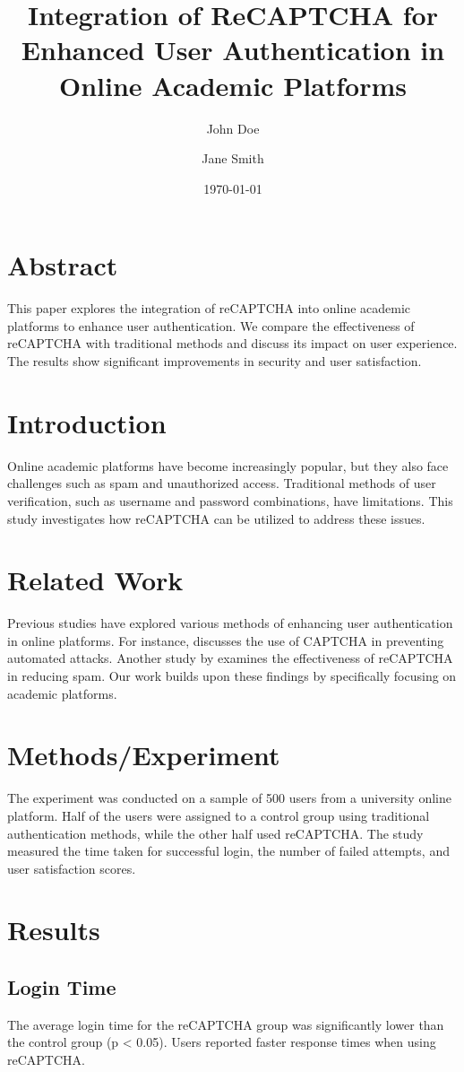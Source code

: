 \documentclass{article}
\title{Integration of ReCAPTCHA for Enhanced User Authentication in Online Academic Platforms}
\author{John Doe \and Jane Smith}
\date{\today}
\begin{document}
\maketitle

\section{Abstract}
This paper explores the integration of reCAPTCHA into online academic platforms to enhance user authentication. We compare the effectiveness of reCAPTCHA with traditional methods and discuss its impact on user experience. The results show significant improvements in security and user satisfaction.

\section{Introduction}
Online academic platforms have become increasingly popular, but they also face challenges such as spam and unauthorized access. Traditional methods of user verification, such as username and password combinations, have limitations. This study investigates how reCAPTCHA can be utilized to address these issues.

\section{Related Work}
Previous studies have explored various methods of enhancing user authentication in online platforms. For instance, \cite{ref1} discusses the use of CAPTCHA in preventing automated attacks. Another study by \cite{ref2} examines the effectiveness of reCAPTCHA in reducing spam. Our work builds upon these findings by specifically focusing on academic platforms.

\section{Methods/Experiment}
The experiment was conducted on a sample of 500 users from a university online platform. Half of the users were assigned to a control group using traditional authentication methods, while the other half used reCAPTCHA. The study measured the time taken for successful login, the number of failed attempts, and user satisfaction scores.

\section{Results}
\subsection{Login Time}
The average login time for the reCAPTCHA group was significantly lower than the control group (p < 0.05). Users reported faster response times when using reCAPTCHA.
\end{document}
